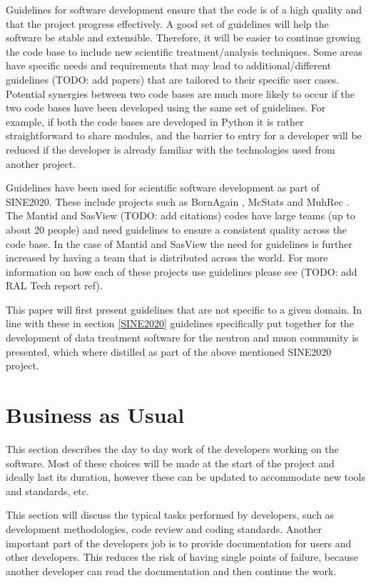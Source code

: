 \documentclass[jnr]{iosart2x}
\begin{document}
Guidelines for software development ensure that the code is of a high quality and that the project progress effectively.
A good set of guidelines will help the software be stable and extensible.
Therefore, it will be easier to continue growing the code base to include new scientific treatment/analysis techniques.
Some areas have specific needs and requirements that may lead to additional/different guidelines \cite{} (TODO: add papers) that are tailored to their specific user cases. Potential synergies between two code bases are much more likely to occur if the two code bases have been developed using the same set of guidelines. For example, if both the code bases are developed in Python it is rather straightforward to share modules, and the barrier to entry for a developer will be reduced if the developer is already familiar with the technologies used from another project. 


Guidelines have been used for scientific software development as part of SINE2020. 
These include projects such as BornAgain \cite{}, McStats \cite{} and MuhRec \cite{}. 
The Mantid \cite{} and SasView \cite{} (TODO: add citations) codes have large teams (up to about 20 people) and need guidelines to ensure a consistent quality across the code base. 
In the case of Mantid and SasView the need for guidelines is further increased by having a team that is distributed across the world. 
For more information on how each of these projects use guidelines please see \cite{} (TODO: add RAL Tech report ref).   

This paper will first present guidelines that are not specific to a given domain.
In line with these in section \ref{SINE2020} guidelines specifically put together for the development of data treatment software for the neutron and muon community is presented, which where distilled as part of the above mentioned SINE2020 project.

\section{Business as Usual}
\label{Business as Usual}

This section describes the day to day work of the developers working on the software.
Most of these choices will be made at the start of the project and ideally last its duration, however these can be updated to accommodate new tools and standards, etc.

This section will discuss the typical tasks performed by developers, such as development methodologies, code review and coding standards.
Another important part of the developers job is to provide documentation for users and other developers.
This reduces the risk of having single points of failure, because another developer can read the documentation and then continue the work.
\end{document}
